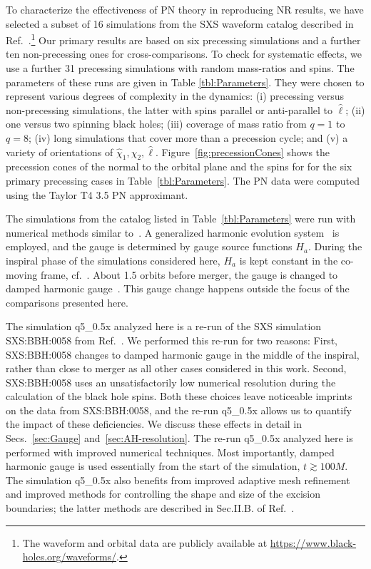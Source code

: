 \documentclass[aps,prd,amsmath,floatfix,twocolumn,superscriptaddress,nofootinbib,showpacs]{revtex4-1}
\newcommand{\ellHat}{\ensuremath{\hat{\ell}}}
\begin{document}
To characterize the effectiveness of PN theory in reproducing NR
results, we have selected a subset of 16 simulations from the SXS
waveform catalog described in
Ref.~\cite{PhysRevLett.111.241104}.\footnote{The waveform and orbital
  data are publicly available at
  \url{https://www.black-holes.org/waveforms/}.} Our primary results
are based on six precessing simulations and a further ten
non-precessing ones for cross-comparisons.  To check for systematic
effects, we use a further 31 precessing simulations with random
mass-ratios and spins. The parameters of these runs are given in Table
\ref{tbl:Parameters}. They were chosen to represent various degrees of
complexity in the dynamics: (i) precessing versus non-precessing
simulations, the latter with spins parallel or anti-parallel to
$\ellHat$; (ii) one versus two spinning black holes; (iii) coverage of
mass ratio from $q=1$ to $q=8$; (iv) long simulations that cover more
than a precession cycle; and (v) a variety of orientations of
$\hat{\chi}_{1},\hat{\chi}_{2},\ellHat$.
Figure~\ref{fig:precessionCones} shows the precession cones of the
normal to the orbital plane and the spins for for the six primary
precessing cases in Table~\ref{tbl:Parameters}. The PN data were
computed using the Taylor T4 3.5 PN approximant.

The simulations from the catalog listed in Table~\ref{tbl:Parameters}
were run with numerical methods similar to~\cite{Buchman:2012dw}.  A
generalized harmonic evolution
system~\cite{Friedrich1985,Garfinkle2002,Pretorius2005c,Lindblom2006}
is employed, and the gauge is determined by gauge source functions
$H_a$.  During the inspiral phase of the simulations considered here,
$H_a$ is kept constant in the co-moving frame,
cf.~\cite{Scheel2009,Chu2009,Boyle2007}.  About 1.5 orbits before
merger, the gauge is changed to damped harmonic
gauge~\cite{Lindblom2009c,Szilagyi:2009qz,Choptuik:2009ww}.  This
gauge change happens outside the focus of the comparisons presented
here.


The simulation q5\_0.5x analyzed here is a re-run of the SXS
simulation SXS:BBH:0058 from Ref.~\cite{PhysRevLett.111.241104}.  We
performed this re-run for two reasons: First, SXS:BBH:0058 changes to
damped harmonic gauge in the middle of the inspiral, rather than close
to merger as all other cases considered in this work. Second,
SXS:BBH:0058 uses an unsatisfactorily low numerical resolution during
the calculation of the black hole spins.  Both these choices leave
noticeable imprints on the data from SXS:BBH:0058, and the re-run
q5\_0.5x allows us to quantify the impact of these deficiencies.  We
discuss these effects in detail in Secs.~\ref{sec:Gauge}
and~\ref{sec:AH-resolution}.  The re-run q5\_0.5x analyzed here is
performed with improved numerical techniques.  Most importantly,
damped harmonic gauge is used essentially from the start of the
simulation, $t\gtrsim 100M$.  The simulation q5\_0.5x also benefits
from improved adaptive mesh refinement~\cite{Szilagyi2014} and
improved methods for controlling the shape and size of the excision
boundaries; the latter methods are described in Sec.II.B. of
Ref.~\cite{Scheel:2014ina}.
\end{document}
